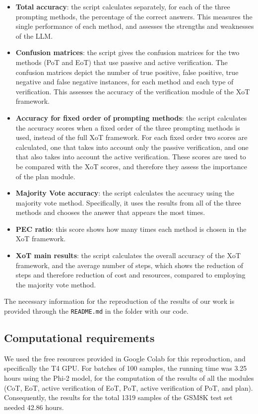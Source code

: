 \documentclass[10pt]{article} %
\begin{document}
\begin{itemize}  
  \item \textbf{Total accuracy}: the script calculates separately, for each of the three prompting methods, the percentage of the correct answers. This measures the single performance of each method, and assesses the strengths and weaknesses of the LLM.
  \item \textbf{Confusion matrices}: the script gives the confusion matrices for the two methods (PoT and EoT) that use passive and active verification. The confusion matrices depict the number of true positive, false positive, true negative and false negative instances, for each method and each type of verification. This assesses the accuracy of the verification module of the XoT framework.
  \item \textbf{Accuracy for fixed order of prompting methods}: the script calculates the accuracy scores when a fixed order of the three prompting methods is used, instead of the full XoT framework. For each fixed order two scores are calculated, one that takes into account only the passive verification, and one that also takes into account the active verification. These scores are used to be compared with the XoT scores, and therefore they assess the importance of the plan module.
  \item \textbf{Majority Vote accuracy}: the script calculates the accuracy using the majority vote method. Specifically, it uses the results from all of the three methods and chooses the answer that appears the most times.
  \item \textbf{PEC ratio}: this score shows how many times each method is chosen in the XoT framework.
  \item \textbf{XoT main results}: the script calculates the overall accuracy of the XoT framework, and the average number of steps, which shows the reduction of steps and therefore reduction of cost and resources, compared to employing the majority vote method.
\end{itemize}

The necessary information for the reproduction of the results of our work is provided through the \texttt{README.md} in the folder with our code.

\subsection{Computational requirements}
We used the free resources provided in Google Colab for this reproduction, and specifically the T4 GPU. For batches of 100 samples, the running time was 3.25 hours using the Phi-2 model, for the computation of the results of all the modules (CoT, EoT, active verification of EoT, PoT, active verification of PoT, and plan). Consequently, the results for the total 1319 samples of the GSM8K test set needed 42.86 hours. 
\end{document}
